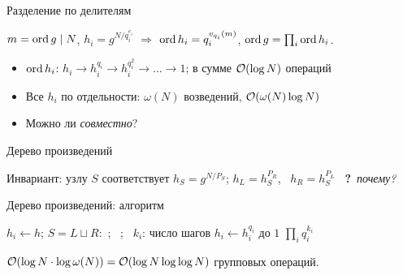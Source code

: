 \documentclass{ca-slides}
\begin{document}
\begin{canvasframe}{Разделение по делителям}
  \begin{lemma}
    $m = \operatorname{ord} g \mid N$, $h_i = g^{N/q_i^{e_i}}$ $\Rightarrow$ $\operatorname{ord} h_i = q_i^{v_{q_i}(m)}$,\quad
    $\operatorname{ord} g = \prod_i \operatorname{ord} h_i$.
  \end{lemma}
  \begin{itemize}
    \item $\operatorname{ord} h_i$: $h_i \to h_i^{q_i} \to h_i^{q_i^2} \to \dots \to 1$; в сумме
      $\mathcal{O}(\log N)$ операций
    \item Все $h_i$ по отдельности: $\omega(N)$ возведений, $\mathcal{O}(\omega(N) \log N)$
    \item Можно ли \emph{совместно}?
  \end{itemize}
\end{canvasframe}

\begin{canvasframe}{Дерево произведений}
  \centering

  \raggedright\small
  Инвариант: узлу $S$ соответствует $h_S = g^{N/P_S}$;\quad
  $h_L = h_S^{P_R}$, \ $h_R = h_S^{P_L}$ \ \textcolor{caRed}{\textbf{?}~\itshape почему?}
\end{canvasframe}

\begin{canvasframe}{Дерево произведений: алгоритм}
  \begin{algorithm}
  \begin{algorithmic}[1]
     
       $h_i \gets h$; \Return \EndIf
      \State $S = L \sqcup R$:\ ;\ 
    \EndFunction
    \State {}; \ $k_i$: число шагов $h_i \gets h_i^{q_i}$ до $1$
    \State \Return $\prod_i q_i^{k_i}$
  \end{algorithmic}
  \end{algorithm}
  \begin{theorem}
    $\mathcal{O}(\log N \cdot \log \omega(N)) = \mathcal{O}(\log N \log\log N)$ групповых операций.
  \end{theorem}
\end{canvasframe}
\end{document}

